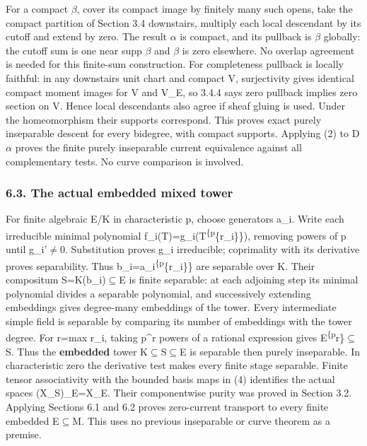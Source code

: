 \documentclass[
  10pt,
]{article}
\begin{document}
For a compact \ensuremath{\beta}, cover its compact image by finitely many such opens,
take the compact partition of Section 3.4 downstairs, multiply each
local descendant by its cutoff and extend by zero. The result \ensuremath{\alpha} is
compact, and its pullback is \ensuremath{\beta} globally: the cutoff sum is one near supp
\ensuremath{\beta} and \ensuremath{\beta} is zero elsewhere. No overlap agreement is needed for this
finite-sum construction. For completeness pullback is locally faithful:
in any downstairs unit chart and compact V, surjectivity gives identical
compact moment images for V and V\_E, so 3.4.4 says zero pullback
implies zero section on V. Hence local descendants also agree if sheaf
gluing is used. Under the homeomorphism their supports correspond. This
proves exact purely inseparable descent for every bidegree, with compact
supports. Applying (2) to D\ensuremath{\alpha} proves the finite purely inseparable
current equivalence against all complementary tests. No curve comparison
is involved.

\subsubsection{6.3. The actual embedded mixed
tower}\label{the-actual-embedded-mixed-tower}

For finite algebraic E/K in characteristic p, choose generators a\_i.
Write each irreducible minimal polynomial
f\_i(T)=g\_i(T\textsuperscript{\{p}\{r\_i\}\}), removing powers of p
until g\_i'\ensuremath{\ne}0. Substitution proves g\_i irreducible; coprimality with
its derivative proves separability. Thus
b\_i=a\_i\textsuperscript{\{p}\{r\_i\}\} are separable over K. Their
compositum S=K(b\_i)\ensuremath{\subseteq}E is finite separable: at each adjoining step its
minimal polynomial divides a separable polynomial, and successively
extending embeddings gives degree-many embeddings of the tower. Every
intermediate simple field is separable by comparing its number of
embeddings with the tower degree. For r=max r\_i, taking p\^{}r powers
of a rational expression gives E\textsuperscript{\{p}r\}\ensuremath{\subseteq}S. Thus the
\textbf{embedded} tower K\ensuremath{\subseteq}S\ensuremath{\subseteq}E is separable then purely inseparable. In
characteristic zero the derivative test makes every finite stage
separable. Finite tensor associativity with the bounded basis maps in
(4) identifies the actual spaces (X\_S)\_E=X\_E. Their componentwise
purity was proved in Section 3.2. Applying Sections 6.1 and 6.2 proves
zero-current transport to every finite embedded E\ensuremath{\subseteq}M. This uses no
previous inseparable or curve theorem as a premise.
\end{document}
